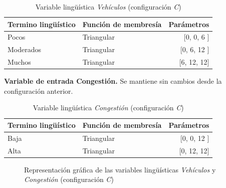 \begin{table}[!h]
	\centering
	\begin{tabular}{llr} \toprule
		Termino lingüístico & Función de membresía & Parámetros \\ \midrule
		Pocos & Triangular & [0, 0, 6 ] \\
		Moderados & Triangular & [0, 6, 12 ] \\
		Muchos & Triangular & [6, 12, 12] \\ \bottomrule
	\end{tabular}
	\caption{Variable lingüística \textit{Vehículos} (configuración \textit{C})}
\end{table}


\textbf{Variable de entrada Congestión.} Se mantiene sin cambios desde la configuración anterior.\\


\begin{table}[!h]
	\centering
	\begin{tabular}{llr} \toprule
		Termino lingüístico & Función de membresía & Parámetros \\ \midrule
		Baja & Triangular & [0, 0, 12 ] \\
		Alta & Triangular & [0, 12, 12] \\ \bottomrule
	\end{tabular}
	\caption{Variable lingüística \textit{Congestión} (configuración \textit{C})}
\end{table}

\begin{figure}[H]
	\centering
	\caption{Representación gráfica de las variables lingüísticas \textit{Vehículos} y \textit{Congestión} (configuración \textit{C})}
\end{figure}

